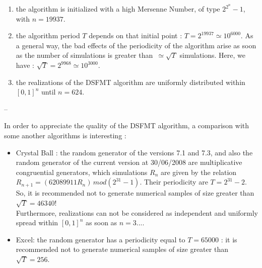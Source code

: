 {\begin{itemize}
    \begin{enumerate}
    \item the algorithm is initialized with a high Mersenne Number, of type $2^{2^n}-1$, with $n=19937$.
    \item the algorithm period $T$ depends on that initial point : $T = 2^{19937} \simeq 10^{6000}$. As a general way, the bad effects of the periodicity of the algorithm arise as soon as the number of simulations is greater than $\, \simeq \sqrt{T}$ simulations. Here, we have : $\sqrt{T} =2^{9968}\simeq 10^{3000}$.
    \item the realizations of the DSFMT algorithm are uniformly distributed within $[0,1]^n$ until $n=624$.
    \end{enumerate}
  \end{itemize}


}
{--}


{
  In order to appreciate the quality of the DSFMT algorithm, a comparison with some another algorithms is interesting :
  \begin{itemize}
  \item Crystal Ball : the random generator of the versions 7.1 and 7.3, and also the random generator of the current version at 30/06/2008 are multiplicative congruential generators, which simulations $R_n$ are given by the relation $R_{n+1}=(62089911 R_n) \, mod (2^{31} - 1)$. Their periodicity are $T = 2^{31}-2$. \\
    So, it is recommended not to generate numerical samples of size greater than $\sqrt{T} = 46340$!\\
    Furthermore, realizations can not be considered as independent and uniformly spread within  $[0,1]^n$ as soon as $n=3$....

  \item Excel: the random generator has a periodicity equal to $T = 65000$ : it is recommended not to generate numerical samples of size greater than $\sqrt{T} = 256$.

  \end{itemize}



}
\Example{
  --
}
